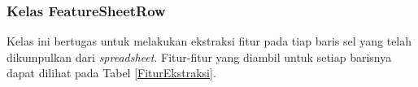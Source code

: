

	\subsubsection{Kelas FeatureSheetRow}
	Kelas ini bertugas untuk melakukan ekstraksi fitur pada tiap baris sel yang telah dikumpulkan dari \textit{spreadsheet}. Fitur-fitur yang diambil untuk setiap barisnya dapat dilihat pada Tabel \ref{FiturEkstraksi}.

